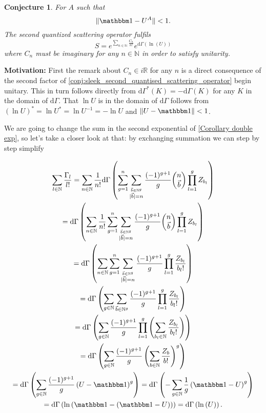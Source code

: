 \documentclass[b5paper,draft,openbib,12pt]{memoir}
\newtheorem{Conj}[Def]{Conjecture}
\newcommand{\id}{{\mathbbm 1}}
\begin{document}
\begin{Conj}
For \(A\) such that 
\begin{equation}
\|\id-U^A\|<1.
\end{equation}
The second quantized scattering operator fulfils
\begin{equation}\label{conj:sleek_second_quantised_scattering_operator}
S= e^{\sum_{n\in\mathbb{N}} \frac{C_n}{n!}} e^{\mathrm{d}\Gamma(\ln (U))}
\end{equation}
where \(C_n\) must be imaginary for any \(n\in\mathbb{N}\) in order to satisfy unitarity.

\end{Conj}
\textbf{Motivation:} 
First the remark about \(C_n \in i \mathbb{R}\) for any \(n\) is a direct consequence of 
the second factor of \eqref{conj:sleek_second_quantised_scattering_operator} begin unitary.
This in turn follows directly from \(\mathrm{d}\Gamma^* (K)=-\mathrm{d}\Gamma(K)\) for any \(K\) in the domain of \(\mathrm{d}\Gamma\).
That \(\ln U\) is in the domain of \(\mathrm{d}\Gamma\) follows from \( (\ln U)^*=\ln U^*=\ln U^{-1}=-\ln U\)
and \(\|U-\id\|<1\).

 We are going to change the sum in the second exponential of 
\eqref{Corollary double exp}, so let's take a closer look at that: by exchanging summation
we can step by step simplify

\begin{multline}
\sum_{l\in\mathbb{N}} \frac{\mathrm\Gamma_{l}}{l!}= 
\sum_{n \in\mathbb{N}} \frac{1}{n!} 
\mathrm{d}\Gamma\left( \sum_{g=1}^n \sum_{\stackrel{\vec{b}\in\mathbb{N}^g}{|\vec{b}|=n}}\frac{(-1)^{g+1}}{g} 
\binom{n}{\vec{b}} \prod_{l=1}^g Z_{b_l}  \right)\\
=\mathrm{d}\Gamma\left( \sum_{n \in\mathbb{N}} \frac{1}{n!} 
 \sum_{g=1}^n \sum_{\stackrel{\vec{b}\in\mathbb{N}^g}{|\vec{b}|=n}}\frac{(-1)^{g+1}}{g} 
\binom{n}{\vec{b}} \prod_{l=1}^g Z_{b_l}  \right)\\
=\mathrm{d}\Gamma\left( \sum_{n \in\mathbb{N}}
 \sum_{g=1}^n \sum_{\stackrel{\vec{b}\in\mathbb{N}^g}{|\vec{b}|=n}}\frac{(-1)^{g+1}}{g} 
 \prod_{l=1}^g \frac{Z_{b_l}}{b_l!}  \right)\\
=\mathrm{d}\Gamma\left( 
 \sum_{g\in\mathbb{N}} \sum_{\vec{b}\in\mathbb{N}^g}\frac{(-1)^{g+1}}{g} 
\prod_{l=1}^g \frac{Z_{b_l}}{b_l!}  \right)\\
=\mathrm{d}\Gamma\left( 
 \sum_{g\in\mathbb{N}} \frac{(-1)^{g+1}}{g} 
\prod_{l=1}^g \left(\sum_{b_l\in\mathbb{N}} \frac{Z_{b_l}}{b_l!} \right) \right)\\
=\mathrm{d}\Gamma\left( 
 \sum_{g\in\mathbb{N}} \frac{(-1)^{g+1}}{g} 
 \left(\sum_{b\in\mathbb{N}} \frac{Z_{b}}{b!} \right)^g \right)\\
 =\mathrm{d}\Gamma\left( 
 \sum_{g\in\mathbb{N}} \frac{(-1)^{g+1}}{g} 
 \left(U-\id \right)^g \right)
 =\mathrm{d}\Gamma\left( -
 \sum_{g\in\mathbb{N}} \frac{1}{g} 
 \left(\id-U \right)^g \right)\\
  =\mathrm{d}\Gamma\left( 
 \ln \left(\id-\left(\id-U\right) \right) \right)
 =\mathrm{d}\Gamma\left( \ln \left(U\right)\right).
\end{multline}
\end{document}
